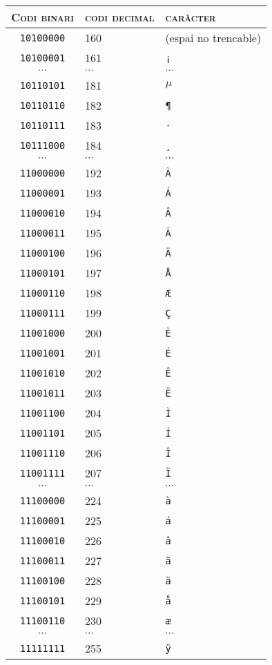\begin{table}
\begin{center}
\begin{tabular}{c|l|l}
\hline\hline \textsc{Codi binari} & \textsc{codi decimal} &
\textsc{caràcter} \\
\hline
\texttt{10100000} & 160 & (espai no trencable)  \\
\texttt{10100001} & 161 & \texttt{¡} \\
$\cdots$          & $\cdots$ & $\cdots$ \\
\texttt{10110101} & 181 & $\mathtt{\mu}$ \\
\texttt{10110110} & 182 & \texttt{¶} \\
\texttt{10110111} & 183 & \texttt{·} \\
\texttt{10111000} & 184 & \texttt{¸} \\
$\cdots$          & $\cdots$ & $\cdots$ \\
\texttt{11000000} & 192 & \texttt{À} \\
\texttt{11000001} & 193 & \texttt{Á} \\
\texttt{11000010} & 194 & \texttt{Â} \\
\texttt{11000011} & 195 & \texttt{Ã} \\
\texttt{11000100} & 196 & \texttt{Ä} \\
\texttt{11000101} & 197 & \texttt{Å} \\
\texttt{11000110} & 198 & \texttt{Æ} \\
\texttt{11000111} & 199 & \texttt{Ç} \\
\texttt{11001000} & 200 & \texttt{È} \\
\texttt{11001001} & 201 & \texttt{É} \\
\texttt{11001010} & 202 & \texttt{Ê} \\
\texttt{11001011} & 203 & \texttt{Ë} \\
\texttt{11001100} & 204 & \texttt{Ì} \\
\texttt{11001101} & 205 & \texttt{Í} \\
\texttt{11001110} & 206 & \texttt{Î} \\
\texttt{11001111} & 207 & \texttt{Ï} \\
$\cdots$          & $\cdots$ & $\cdots$ \\
\texttt{11100000} & 224 & \texttt{à} \\
\texttt{11100001} & 225 & \texttt{á} \\
\texttt{11100010} & 226 & \texttt{â} \\
\texttt{11100011} & 227 & \texttt{ã} \\
\texttt{11100100} & 228 & \texttt{ä} \\
\texttt{11100101} & 229 & \texttt{å} \\
\texttt{11100110} & 230 & \texttt{æ} \\
$\cdots$          & $\cdots$ & $\cdots$ \\
\texttt{11111111} & 255 & \texttt{ÿ} \\


\end{tabular}
\end{center}
\end{table}
